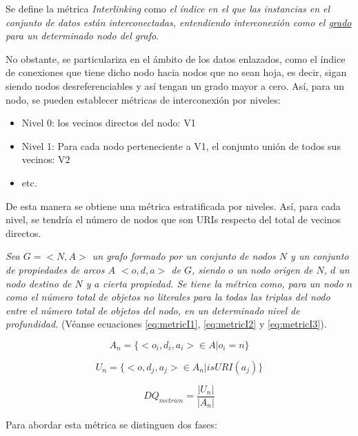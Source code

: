 Se define la métrica \textit{Interlinking} como \textit{el índice en el que las
instancias en el conjunto de datos están interconectadas, entendiendo
interconexión como el \underline{grado} para un determinado nodo del grafo}.

No obstante, se particulariza en el ámbito de los datos enlazados, como el índice de
conexiones que tiene dicho nodo hacia nodos que no sean hoja, es decir, sigan
siendo nodos desreferenciables y así tengan un grado mayor a cero. Así,
para un nodo, se pueden establecer métricas de
interconexión por niveles:

\begin{itemize}
\item Nivel 0: los vecinos directos del nodo: V1 
\item Nivel 1: Para cada nodo perteneciente a V1, el conjunto unión de todos sus
  vecinos: V2
\item etc. 
\end{itemize}

De esta manera se obtiene una métrica estratificada por niveles. Así, para cada nivel, se
tendría el número de nodos que son URIs respecto del total de vecinos directos.

\textit{Sea $G = <N, A>$ un grafo formado por un conjunto de nodos $N$ y un conjunto de
  propiedades de arcos $A$ $<o, d, a>$ de $G$, siendo $o$ un nodo origen de
  $N$, $d$ un nodo destino de $N$ y $a$ cierta propiedad. Se tiene la métrica
  como, para un nodo $n$ como el número total de objetos no literales para la todas las
  triplas del nodo entre el número total de objetos del nodo, en un determinado
  nivel de profundidad.} (Véanse ecuaciones \ref{eq:metricI1}, \ref{eq:metricI2} y \ref{eq:metricI3}).

\begin{equation}
  A_n = \{<o_i,d_i,a_i> \in A |  o_i = n\}
  \label{eq:metricI1}
\end{equation}

\begin{equation}
  U_n = \{<o,d_j,a_j> \in A_n | isURI(a_j) \}
  \label{eq:metricI2}
\end{equation}

\begin{equation}
  DQ_{metricn} = \frac{|U_n|}{|A_n|}
  \label{eq:metricI3}
\end{equation}

Para abordar esta métrica se distinguen dos fases: 

